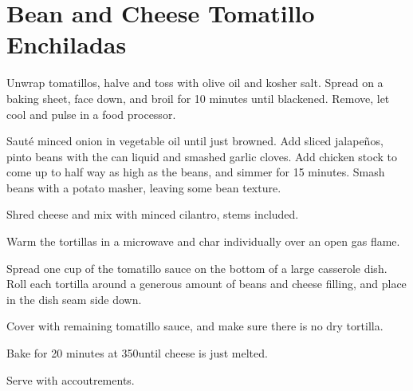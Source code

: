 \section{Bean and Cheese Tomatillo Enchiladas}
\begin{recipe}


Unwrap tomatillos, halve and toss with olive oil and kosher salt. Spread on a
baking sheet, face down, and broil for 10 minutes until blackened. Remove, let
cool and pulse in a food processor.


Sauté minced onion in vegetable oil until just browned. Add sliced jalapeños,
pinto beans with the can liquid and smashed garlic cloves. Add chicken stock to come up to
half way as high as the beans, and simmer for 15 minutes. Smash beans with a
potato masher, leaving some bean texture.


Shred cheese and mix with minced cilantro, stems included.


Warm the tortillas in a microwave and char individually over an open gas flame.

Spread one cup of the tomatillo sauce on the bottom of a large casserole dish.
Roll each tortilla around a generous amount of beans and cheese filling, and
place in the dish seam side down.

Cover with remaining tomatillo sauce, and make sure there is no dry tortilla.

Bake for 20 minutes at 350\degree until cheese is just melted.


Serve with accoutrements.

\end{recipe}
